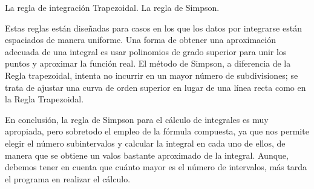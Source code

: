 \documentclass[spanish,a4paper,11pt]{report}
\begin{document}
La regla de integración Trapezoidal. \parindent=1cm 
La regla de Simpson.

\parindent=1cm Estas reglas están diseñadas para casos en los que los datos por integrarse están espaciados de manera uniforme. Una forma de 
obtener una aproximación adecuada de una integral es usar polinomios de grado superior para unir los puntos y aproximar la 
función real.
El método de Simpson, a diferencia de la Regla trapezoidal, intenta no incurrir en un mayor número de subdivisiones; se trata 
de ajustar una curva de orden superior en lugar de una línea recta como en la Regla Trapezoidal.

\parindent=1cm En conclusión, la regla de Simpson para el cálculo de integrales es muy apropiada, pero sobretodo el empleo de la fórmula 
compuesta, ya que nos permite elegir el número subintervalos y calcular la integral en cada uno de ellos, de manera que se 
obtiene un valos bastante aproximado de la integral. Aunque, debemos tener en cuenta que cuánto mayor es el número de intervalos,
más tarda el programa en realizar el cálculo. 

\newpage{\pagestyle{empty}\cleardoublepage}
\thispagestyle{empty}
\end{document}

